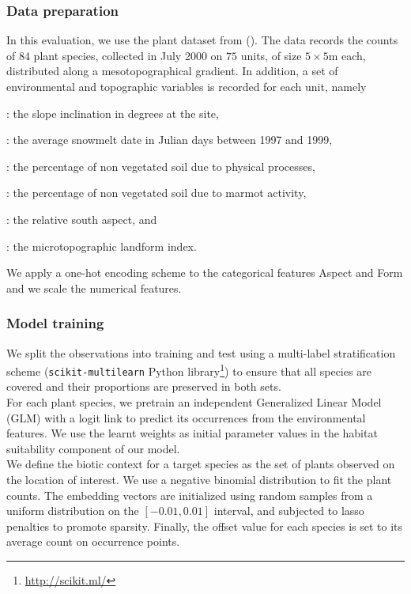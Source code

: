\documentclass[10pt,a4paper]{article}
\begin{document}
\subsubsection{Data preparation}
In this evaluation, we use the plant dataset from (\cite{choler2005consistent}).  The data records the counts of $84$ plant species, collected in July 2000 on $75$ units, of size $5 \times 5$m each, distributed along a mesotopographical gradient. In addition, a set of environmental and topographic variables is recorded for each unit, namely
\begin{description}
  \setlength\itemsep{-.2em}
    \item[\trtSlope]: the slope inclination in degrees at the site,
    \item[\trtSnow]: the average snowmelt date in Julian days between 1997 and 1999,
    \item[\trtPhysD]: the percentage of non vegetated soil due to physical processes,
    \item[\trtZoogD]: the percentage of non vegetated soil due to marmot activity,
    \item[\trtAspect]: the relative south aspect, and
    \item[\trtForm]: the microtopographic landform index.
\end{description}
We apply a one-hot encoding scheme to the categorical features Aspect and Form and we scale the numerical features. 

\subsubsection{Model training}
We split the observations into training and test using a multi-label stratification scheme (\texttt{scikit-multilearn} Python library\footnote{\url{http://scikit.ml/}}) to ensure that all species are covered and their proportions are preserved in both sets. \\

For each plant species, we pretrain an independent Generalized Linear Model (GLM) with a logit link to predict its occurrences from the environmental features. We use the learnt weights as initial parameter values in the habitat suitability component of our model. \\

We define the biotic context for a target species as the set of plants observed on the location of interest. We use a negative binomial distribution to fit the plant counts. The embedding vectors are initialized using random samples from a uniform distribution on the $[-0.01,0.01]$ interval, and subjected to lasso penalties to promote sparsity. Finally, the offset value for each species is set to its average count on occurrence points.\\
\end{document}
